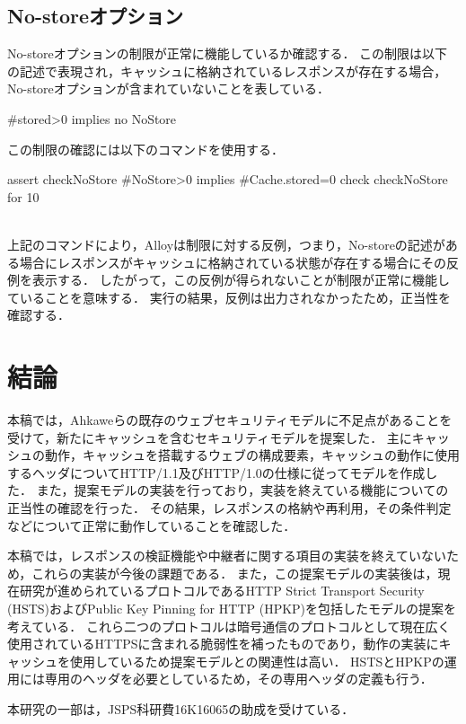 \documentclass{css}
\begin{document}
\subsection{No-storeオプション}
No-storeオプションの制限が正常に機能しているか確認する．
この制限は以下の記述で表現され，キャッシュに格納されているレスポンスが存在する場合，No-storeオプションが含まれていないことを表している．
\begin{verbatimtab}[2]
	#stored>0 implies no NoStore
\end{verbatimtab}
この制限の確認には以下のコマンドを使用する．\\\hrulefill
\begin{small}
\begin{verbatimtab}[2]
assert checkNoStore{
	#NoStore>0 implies #Cache.stored=0
}
check checkNoStore for 10
\end{verbatimtab}
\end{small}
\hrulefill\\
上記のコマンドにより，Alloyは制限に対する反例，つまり，No-storeの記述がある場合にレスポンスがキャッシュに格納されている状態が存在する場合にその反例を表示する．
したがって，この反例が得られないことが制限が正常に機能していることを意味する．
実行の結果，反例は出力されなかったため，正当性を確認する．

\section{結論}
本稿では，Ahkaweらの既存のウェブセキュリティモデル\cite{webmodel}に不足点があることを受けて，新たにキャッシュを含むセキュリティモデルを提案した．
主にキャッシュの動作，キャッシュを搭載するウェブの構成要素，キャッシュの動作に使用するヘッダについてHTTP/1.1及びHTTP/1.0の仕様に従ってモデルを作成した．
また，提案モデルの実装を行っており，実装を終えている機能についての正当性の確認を行った．
その結果，レスポンスの格納や再利用，その条件判定などについて正常に動作していることを確認した．

本稿では，レスポンスの検証機能や中継者に関する項目の実装を終えていないため，これらの実装が今後の課題である．
また，この提案モデルの実装後は，現在研究が進められているプロトコルであるHTTP Strict Transport Security (HSTS)\cite{rfc6797}およびPublic Key Pinning for HTTP (HPKP)\cite{rfc7469}を包括したモデルの提案を考えている．
これら二つのプロトコルは暗号通信のプロトコルとして現在広く使用されているHTTPSに含まれる脆弱性を補ったものであり，動作の実装にキャッシュを使用しているため提案モデルとの関連性は高い．
HSTSとHPKPの運用には専用のヘッダを必要としているため，その専用ヘッダの定義も行う．

\begin{acknowledgment}
本研究の一部は，JSPS科研費16K16065の助成を受けている．
\end{acknowledgment}



\end{document}
